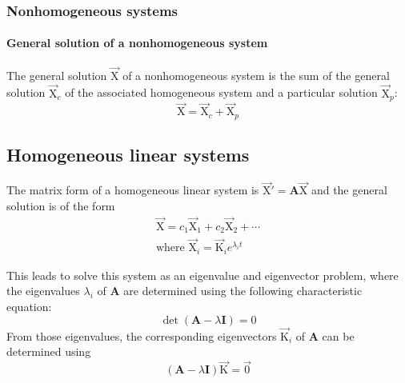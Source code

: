\documentclass[10pt, twocolumn]{article}
\theoremstyle{definition}
\begin{document}
\subsubsection*{Nonhomogeneous systems}
\paragraph*{General solution of a nonhomogeneous system}
The general solution \(\vec{\mathrm{X}}\) of a nonhomogeneous system is the sum of the general solution \(\vec{\mathrm{X}}_c \) of the associated homogeneous system and a particular solution \(\vec{\mathrm{X}}_p \):
\[
  \vec{\mathrm{X}} = \vec{\mathrm{X}}_c + \vec{\mathrm{X}}_p
\]


\subsection{Homogeneous linear systems}
The matrix form of a homogeneous linear system is \(\vec{\mathrm{X}}' = \mathbf{A}\vec{\mathrm{X}}\) and the general solution is of the form
\begin{gather*}
  \vec{\mathrm{X}} = c_1 \vec{\mathrm{X}}_1 + c_2 \vec{\mathrm{X}}_2 + \cdots \\
  \text{where } \vec{\mathrm{X}}_i = \vec{\mathrm{K}}_i e^{\lambda_i t}
\end{gather*}

This leads to solve this system as an eigenvalue and eigenvector problem, where the eigenvalues \(\lambda_i \) of \(\mathbf{A}\) are determined using the following characteristic equation:
\[
  \det(\mathbf{A} - \lambda\mathbf{I}) = 0
\]
From those eigenvalues, the corresponding eigenvectors \(\vec{\mathrm{K}}_i \) of \(\mathbf{A}\) can be determined using
\[
  (\mathbf{A} - \lambda\mathbf{I})\vec{\mathrm{K}} = \vec{0}
\]
\end{document}
